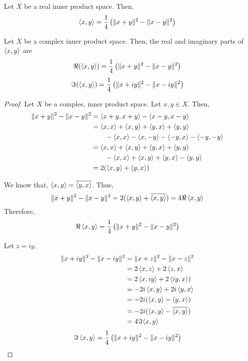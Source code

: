 \begin{remark}
	Let $X$ be a real inner product space.
	Then,
	\[ \left\langle x,y \right\rangle = \frac{1}{4}\left(\|x+y\|^2 - \|x-y\|^2 \right) \]
\end{remark}
\begin{theorem}
	Let $X$ be a complex inner product space.
	Then, the real and imaginary parts of $\left\langle x,y \right\rangle$ are
	\[ \Re(\left\langle x,y \right\rangle) = \frac{1}{4}\left(\|x+y\|^2 - \|x-y\|^2 \right) \]
	\[ \Im(\left\langle x,y \right\rangle) = \frac{1}{4}\left(\|x+iy\|^2 - \|x-iy\|^2 \right) \]
\end{theorem}
\begin{proof}
	Let $X$ be a comples, inner product space.
	Let $x,y \in X$.
	Then,
	\begin{align*}
		\|x+y\|^2-\|x-y\|^2 
		& = \left\langle x+y,x+y \right\rangle - \left\langle x-y,x-y \right\rangle \\
		& = \left\langle x,x \right\rangle + \left\langle x,y \right\rangle + \left\langle y,x \right\rangle + \left\langle y,y \right\rangle \\
		& \qquad - \left\langle x,x \right\rangle - \left\langle x,-y \right\rangle - \left\langle -y,x \right\rangle - \left\langle -y,-y \right\rangle \\
		& = \left\langle x,x \right\rangle + \left\langle x,y \right\rangle + \left\langle y,x \right\rangle + \left\langle y,y \right\rangle \\
		& \qquad - \left\langle x,x \right\rangle + \left\langle x,y \right\rangle + \left\langle y,x \right\rangle - \left\langle y,y \right\rangle \\
		& = 2(\left\langle x,y \right\rangle + \left\langle y,x \right\rangle)
	\end{align*}

	We know that, $\left\langle x,y \right\rangle = \overline{\left\langle y,x \right\rangle}$.
	Thus, 
	\[ \|x+y\|^2 - \|x-y\|^2 = 2(\left\langle x,y \right\rangle+\overline{\left\langle x,y \right\rangle}) = 4\Re \left\langle x,y \right\rangle \]
	Therefore, 
	\[ \Re \left\langle x,y \right\rangle = \frac{1}{4} \left( \|x+y\|^2-\|x-y\|^2 \right) \]
	
	Let $z = iy$.
	\begin{align*}
		\|x+iy\|^2 - \|x-iy\|^2 
		& = \|x+z\|^2 - \|x-z\|^2 \\
		& = 2\left\langle x,z \right\rangle+2\left\langle z,x \right\rangle \\
		& = 2\left\langle x,iy \right\rangle+2\left\langle iy,x \right\rangle) \\
		& = -2i\left\langle x,y \right\rangle + 2i\left\langle y,x \right\rangle \\
		& = -2i(\left\langle x,y \right\rangle-\left\langle y,x \right\rangle) \\
		& = -2i(\left\langle x,y \right\rangle-\overline{\left\langle x,y \right\rangle}) \\
		& = 4 \Im{\left\langle x,y \right\rangle} 
	\end{align*}
	\[ \Im \left\langle x,y \right\rangle = \frac{1}{4} \left( \|x+iy\|^2-\|x-iy\|^2 \right) \]
\end{proof}
